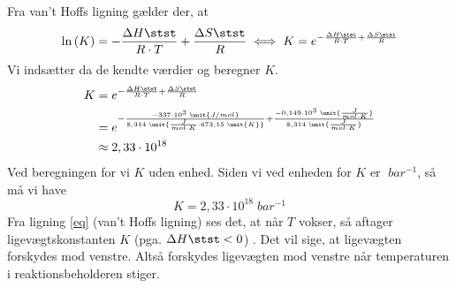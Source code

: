 \documentclass{report}
\begin{document}
Fra van't Hoffs ligning gælder der, at
\begin{equation*}
\begin{split}
  \ln\left(K\right) = - \frac{\Delta H \stst }{R \cdot T} + \frac{\Delta S \stst }{R} \iff K=e^{- \frac{\Delta H \stst }{R \cdot T} + \frac{\Delta S \stst }{R}} 
\end{split}
\end{equation*}
Vi indsætter da de kendte værdier og beregner $K$.
\begin{equation}
\begin{split}
  K&=e^{- \frac{\Delta H \stst }{R \cdot T} + \frac{\Delta S \stst }{R}} \\
  &=e^{-\frac{-337 \cdot 10^3\;\unit{J/mol} }{8,314 \;\unit{\frac{J}{mol \cdot K} \cdot 673,15 \;\unit{K} } } + \frac{-0,149 \cdot 10^3 \;\unit{\frac{J}{mol \cdot K}} }{8,314 \;\unit{\frac{J}{mol \cdot K}} }} \\
  &\approx 2,33 \cdot 10 ^{18} 
\end{split}
  \label{eq}
\end{equation}
Ved beregningen for vi $K$ uden enhed. 
Siden vi ved enheden for $K$ er $\;\unit{bar ^{-1}} $, så må vi have 
\[
K=2,33 \cdot 10 ^{18} \;\unit{bar ^{-1}} 
\] 
Fra ligning \ref{eq} (van't Hoffs ligning) ses det, at når $T$ vokser, så aftager ligevægtskonstanten $K$ (pga. $\Delta H \stst <0$) .
Det vil sige, at ligevægten forskydes mod venstre.
Altså forskydes ligevægten mod venstre når temperaturen i reaktionsbeholderen stiger.
\end{document}
